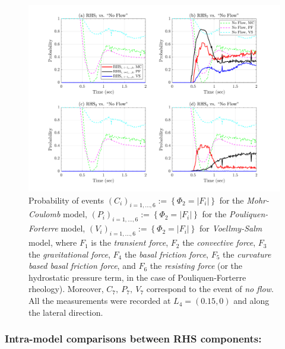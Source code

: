 \documentclass{article}
\begin{document}
\begin{figure}[H]
        \centering
        \includegraphics[width=1\textwidth]{InclinedPlane/Dominance1/DominancePrY_L4.png}
        \caption{Probability of events $(C_i)_{i=1,...,6}:=\left\{\Phi_2=|F_i|\right\}$ for the \emph{Mohr-Coulomb} model, $(P_i)_{i=1,...,6}:=\left\{\Phi_2=|F_i|\right\}$ for the \emph{Pouliquen-Forterre} model, $(V_i)_{i=1,...,6}:=\left\{\Phi_2=|F_i|\right\}$ for \emph{Voellmy-Salm} model, where $F_1$ is the \emph{transient force}, $F_2$ the \emph{convective force}, $F_3$ the \emph{gravitational force}, $F_4$ the \emph{basal friction force}, $F_5$ the \emph{curvature based basal friction force}, and $F_6$ the \emph{resisting force} (or the hydrostatic pressure term, in the case of Pouliquen-Forterre rheology). Moreover, $C_7,\ P_7,\ V_7$ correspond to the event of \emph{no flow}. All the measurements were recorded at $L_4=(0.15,0)$ and along the lateral direction.}
        \label{fig:Ramp-FYDominance1-L4}
\end{figure}

\subsubsection{Intra-model comparisons between RHS components:}\label{subsubsec:ramp-intramodelsPrs}
\end{document}
